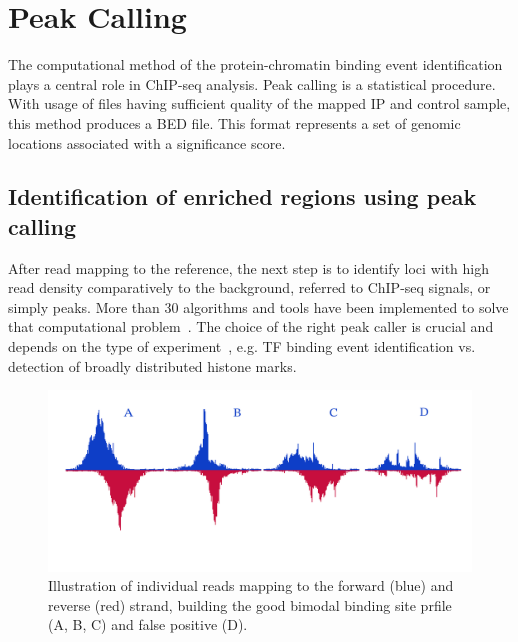 \chapter{Peak Calling}

The computational method of the protein-chromatin binding event identification plays a central role in ChIP-seq analysis. 
Peak calling is a statistical procedure.
With usage of files having sufficient quality of the mapped IP and control sample, this method produces a BED file.
This format represents a set of genomic locations associated with a significance score.

\section{Identification of enriched regions using peak calling}



 
After read mapping to the reference, the next step is to identify loci with high read density comparatively to the background, referred to ChIP-seq signals, or simply peaks.
More than 30 algorithms and tools have been implemented to solve that computational problem~\cite{chen2012systematic}.
The choice of the right peak caller is crucial and depends on the type of experiment~\cite{nakato2017recent}, e.g. TF binding event identification vs. detection of broadly distributed histone marks.

\begin{figure}[b!]
    \centering
    \includegraphics[width=\textwidth]{../img/peaks_final.pdf}
    \caption{Illustration of individual reads mapping to the forward (blue) and reverse (red) strand, building the good bimodal binding site prfile (A, B, C) and false positive (D). }
    \label{fig:graph_classes}
\end{figure}

